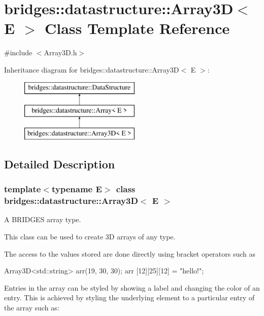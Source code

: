 \hypertarget{classbridges_1_1datastructure_1_1_array3_d}{}\section{bridges\+:\+:datastructure\+:\+:Array3D$<$ E $>$ Class Template Reference}
\label{classbridges_1_1datastructure_1_1_array3_d}


{\ttfamily \#include $<$Array3\+D.\+h$>$}

Inheritance diagram for bridges\+:\+:datastructure\+:\+:Array3D$<$ E $>$\+:\begin{figure}[H]
\begin{center}
\leavevmode
\includegraphics[height=3.000000cm]{classbridges_1_1datastructure_1_1_array3_d}
\end{center}
\end{figure}


\subsection{Detailed Description}
\subsubsection*{template$<$typename E$>$\newline
class bridges\+::datastructure\+::\+Array3\+D$<$ E $>$}

A B\+R\+I\+D\+G\+ES array type. 

This class can be used to create 3D arrays of any type.

The access to the values stored are done directly using bracket operators such as


\begin{DoxyCode}
Array3D<std::string> arr(19, 30, 30);
arr [12][25][12] = \textcolor{stringliteral}{"hello!"};
\end{DoxyCode}


Entries in the array can be styled by showing a label and changing the color of an entry. This is achieved by styling the underlying element to a particular entry of the array such as\+:


